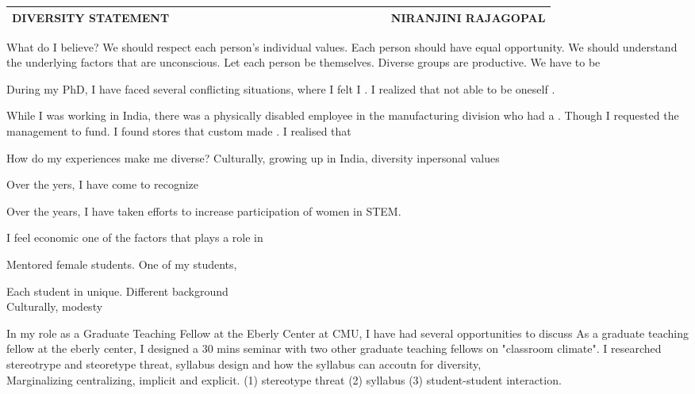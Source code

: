 \documentclass[10pt]{article}
\date{}
\begin{document}


\begin{table}
\color{blue}
\begin{tabular*}{\textwidth}{l r}
\large\textbf{DIVERSITY STATEMENT} & 
\hfill \ \ \ \ \ \ \ \ \ \ \ \ \ \ \ \ \ \ \ \
\ \ \ \ \ \ \ \ \ \ \ \ \ 
\large\textbf{NIRANJINI RAJAGOPAL}\\
\hline
\end{tabular*}

\end{table}

What do I believe?
We should respect each person's individual values.
Each person should have equal opportunity.
We should understand the underlying factors that are unconscious.
Let each person be themselves.
Diverse groups are productive.
We have to be 

During my PhD, I have faced several conflicting situations, where I felt I . I realized that not able to be oneself .

While I was working in India, there was a physically disabled employee in the manufacturing division who had a . Though 
I requested the management to fund. I found stores that custom made . I realised that 





How do my experiences make me diverse?
Culturally, growing up in India, diversity inpersonal values

Over the yers, I have come to recognize 

Over the years, I have taken efforts to increase participation of women in STEM.

I feel economic one of the factors that plays a role in 

Mentored female students. One of my students, 

Each student in unique. Different background\\

Culturally, modesty 

In my role as a Graduate Teaching Fellow at the Eberly Center at CMU, I have had several opportunities to discuss 
 As a graduate teaching fellow at the eberly center, I designed a 30 mins seminar with two other graduate teaching fellows on "classroom climate". I researched stereotrype and steoretype threat, syllabus design and how the syllabus can accoutn for diversity, \\
 Marginalizing centralizing, implicit and explicit.
 (1) stereotype threat (2) syllabus (3) student-student interaction.\\
\end{document}
